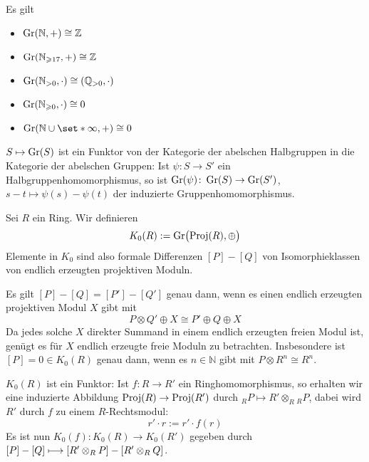 \begin{beispiel}[{name=[{für Grothendiek-Konstruktionen}]}]
	Es gilt
	\begin{multicols}{2}
		\begin{itemize}
			\item $\Gr(\mathbb{N},+) \cong \mathbb{Z}$
			\item $\Gr(\mathbb{N}_{\ge 17},+) \cong \mathbb{Z}$
			\item $\Gr(\mathbb{N}_{>0},\cdot ) \cong (\mathbb{Q}_{>0},\cdot )$
			\item $\Gr(\mathbb{N}_{\ge 0},\cdot) \cong 0$
			\item $\Gr(\mathbb{N} \cup \set*{\infty},+) \cong 0$
		\end{itemize}
	\end{multicols}
\end{beispiel}

\begin{bemerkung}[{name=[{Funktorialität}]}]
	$S \mapsto \Gr(S)$ ist ein Funktor von der Kategorie der abelschen Halbgruppen in die Kategorie der abelschen Gruppen:
	Ist $\psi \colon S \to S'$ ein Halbgruppenhomomorphismus, so ist $\Gr(\psi) \colon \Gr(S) \to \Gr(S')$, $s-t \mapsto \psi(s) - \psi(t)$ der induzierte Gruppenhomomorphismus.
\end{bemerkung}

\begin{definition}[{name=[{$K_0$ von Ringen}]}]
	Sei $R$ ein Ring. 
	Wir definieren
	\[
		K_0(R) := \Gr \enbrace[\big]{\Proj(R),\oplus }
	\]
	Elemente in $K_0$ sind also formale Differenzen $[P]- [Q]$ von Isomorphieklassen von endlich erzeugten projektiven Moduln.
\end{definition}

Es gilt $[P] - [Q] = [P']- [Q']$ genau dann, wenn es einen endlich erzeugten projektiven Modul $X$ gibt mit
\[
	P \otimes Q' \oplus X \cong P' \oplus Q \oplus X
\]
Da jedes solche $X$ direkter Summand in einem endlich erzeugten freien Modul ist, genügt es für $X$ endlich erzeugte freie Moduln zu betrachten.
Insbesondere ist $[P]=0 \in K_0(R)$ genau dann, wenn es $n \in \mathbb{N}$ gibt mit $P \otimes R^n \cong R^n$.

\begin{bemerkung}[{name=[{Funktoreigenschaften der 0-ten K-Theorie}]}]
	$K_0(R)$ ist ein Funktor: Ist $f \colon R \to R'$ ein Ringhomomorphismus, so erhalten wir eine induzierte Abbildung $\Proj(R) \to \Proj(R')$ durch $_R P \mapsto  R' \otimes_R {_R P}$, dabei wird $R'$ durch $f$ zu einem $R$-Rechtsmodul:
	\[
		r' \cdot r := r' \cdot f(r)
	\]
	Es ist nun $K_0(f) \colon K_0(R) \to K_0(R')$ gegeben durch 
	\(
		[P]- [Q] \longmapsto \benbrace*{R' \otimes_R P} - \benbrace*{R' \otimes_R Q}
	\).
\end{bemerkung}

